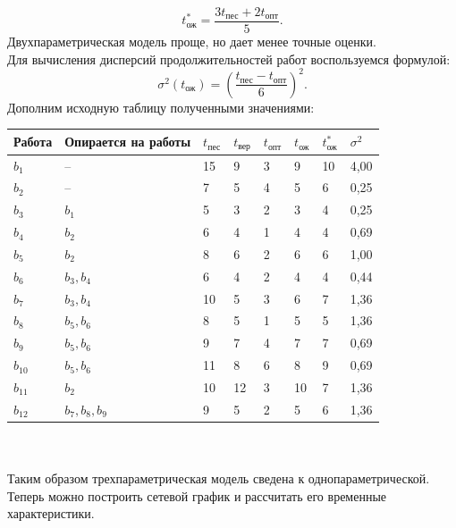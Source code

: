 \documentclass[a4paper, 12pt]{report}
\begin{document}
	$$t_\text{ож}^*=\frac{3t_\text{пес}+2t_\text{опт}}{5}.$$
	Двухпараметрическая модель проще, но дает менее точные оценки.\\
	Для вычисления дисперсий продолжительностей работ воспользуемся формулой:
	$$\sigma^2(t_\text{ож})=\left(\frac{t_\text{пес}-t_\text{опт}}{6}\right)^2.$$
	Дополним исходную таблицу полученными значениями:\\
	\begin{tabular}{ |p{3cm}||p{4cm}||p{1cm}||p{1cm}||p{1cm}||p{1cm}||p{1cm}||p{1cm}|}
		\hline
		Работа & Опирается на работы & $t_\text{пес}$ & $t_\text{вер}$ & $t_\text{опт}$ & $t_\text{ож}$ & $t_\text{ож}^*$ & $\sigma^2$\\
		\hline
		$b_1$ & -- & 15 & 9 & 3 & 9 & 10 & 4,00\\
		$b_2$ & -- & 7 & 5 & 4 & 5 & 6 & 0,25\\
		$b_3$ & $b_1$ & 5 & 3 & 2 & 3 & 4 & 0,25\\
		$b_4$ & $b_2$ & 6 & 4 & 1 & 4 & 4 & 0,69\\
		$b_5$ & $b_2$ & 8 & 6 & 2 & 6 & 6 & 1,00\\
		$b_6$ & $b_3,b_4$ & 6 & 4 & 2 & 4 & 4 & 0,44\\
		$b_7$ & $b_3,b_4$ & 10 & 5 & 3 & 6 & 7 & 1,36\\
		$b_8$ & $b_5,b_6$ & 8 & 5 & 1 & 5 & 5 & 1,36\\
		$b_9$ & $b_5,b_6$ & 9 & 7 & 4 & 7 & 7 & 0,69\\
		$b_{10}$ & $b_5,b_6$ & 11 & 8 & 6 & 8 & 9 & 0,69\\
		$b_{11}$ & $b_2$ & 10 & 12 & 3 & 10 & 7 & 1,36\\
		$b_{12}$ & $b_7,b_8,b_9$ & 9 & 5 & 2 & 5 & 6 & 1,36\\
		\hline
	\end{tabular}\\\\
	Таким образом трехпараметрическая модель сведена к однопараметрической.\\
	Теперь можно построить сетевой график и рассчитать его временные характеристики.
\end{document}
